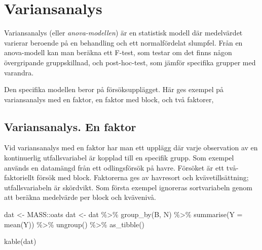 \documentclass[
]{book}
\newenvironment{Shaded}{\begin{snugshade}}{\end{snugshade}}
\newcommand{\AttributeTok}[1]{\textcolor[rgb]{0.77,0.63,0.00}{#1}}
\newcommand{\FunctionTok}[1]{\textcolor[rgb]{0.00,0.00,0.00}{#1}}
\newcommand{\NormalTok}[1]{#1}
\newcommand{\OtherTok}[1]{\textcolor[rgb]{0.56,0.35,0.01}{#1}}
\newcommand{\SpecialCharTok}[1]{\textcolor[rgb]{0.00,0.00,0.00}{#1}}
\theoremstyle{definition}
\theoremstyle{definition}
\theoremstyle{definition}
\theoremstyle{definition}
\theoremstyle{remark}
\begin{document}
\hypertarget{variansanalys}{%
\chapter{Variansanalys}\label{variansanalys}}

Variansanalys (eller \emph{anova-modellen}) är en statistisk modell där medelvärdet varierar beroende på en behandling och ett normalfördelat slumpfel. Från en anova-modell kan man beräkna ett F-test, som testar om det finns någon övergripande gruppskillnad, och post-hoc-test, som jämför specifika grupper med varandra.

Den specifika modellen beror på försöksupplägget. Här ges exempel på variansanalys med en faktor, en faktor med block, och två faktorer,

\hypertarget{variansanalys.-en-faktor}{%
\section{Variansanalys. En faktor}\label{variansanalys.-en-faktor}}

Vid variansanalys med en faktor har man ett upplägg där varje observation av en kontinuerlig utfallsvariabel är kopplad till en specifik grupp. Som exempel används en datamängd från ett odlingsförsök på havre. Försöket är ett två-faktoriellt försök med block. Faktorerna ges av havresort och kvävetillsättning; utfallsvariabeln är skördvikt. Som första exempel ignoreras sortvariabeln genom att beräkna medelvärde per block och kvävenivå.

\begin{Shaded}
\begin{Highlighting}[]
\NormalTok{dat }\OtherTok{\textless{}{-}}\NormalTok{ MASS}\SpecialCharTok{::}\NormalTok{oats}
\NormalTok{dat }\OtherTok{\textless{}{-}}\NormalTok{ dat }\SpecialCharTok{\%\textgreater{}\%} 
  \FunctionTok{group\_by}\NormalTok{(B, N) }\SpecialCharTok{\%\textgreater{}\%} 
  \FunctionTok{summarise}\NormalTok{(}\AttributeTok{Y =} \FunctionTok{mean}\NormalTok{(Y)) }\SpecialCharTok{\%\textgreater{}\%} 
  \FunctionTok{ungroup}\NormalTok{() }\SpecialCharTok{\%\textgreater{}\%} 
  \FunctionTok{as\_tibble}\NormalTok{()}

\FunctionTok{kable}\NormalTok{(dat)}
\end{Highlighting}
\end{Shaded}
\end{document}
